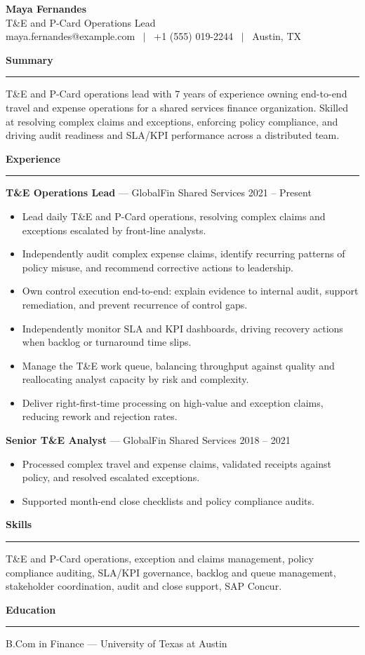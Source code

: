 \documentclass[11pt]{article}
\newcommand{\rsection}[1]{%
  \vspace{10pt}
  {\large\bfseries #1}\\[-4pt]
  \rule{\linewidth}{0.6pt}\vspace{4pt}
}
\begin{document}
\begin{center}
  {\Huge\bfseries Maya Fernandes}\\[4pt]
  T\&E and P-Card Operations Lead \\
  maya.fernandes@example.com \ $\vert$ \ +1 (555) 019-2244 \ $\vert$ \ Austin, TX
\end{center}

\rsection{Summary}
T\&E and P-Card operations lead with 7 years of experience owning end-to-end travel and expense operations for a shared services finance organization. Skilled at resolving complex claims and exceptions, enforcing policy compliance, and driving audit readiness and SLA/KPI performance across a distributed team.

\rsection{Experience}
\textbf{T\&E Operations Lead} --- GlobalFin Shared Services \hfill 2021 -- Present
\begin{itemize}
  \item Lead daily T\&E and P-Card operations, resolving complex claims and exceptions escalated by front-line analysts.
  \item Independently audit complex expense claims, identify recurring patterns of policy misuse, and recommend corrective actions to leadership.
  \item Own control execution end-to-end: explain evidence to internal audit, support remediation, and prevent recurrence of control gaps.
  \item Independently monitor SLA and KPI dashboards, driving recovery actions when backlog or turnaround time slips.
  \item Manage the T\&E work queue, balancing throughput against quality and reallocating analyst capacity by risk and complexity.
  \item Deliver right-first-time processing on high-value and exception claims, reducing rework and rejection rates.
\end{itemize}

\textbf{Senior T\&E Analyst} --- GlobalFin Shared Services \hfill 2018 -- 2021
\begin{itemize}
  \item Processed complex travel and expense claims, validated receipts against policy, and resolved escalated exceptions.
  \item Supported month-end close checklists and policy compliance audits.
\end{itemize}

\rsection{Skills}
T\&E and P-Card operations, exception and claims management, policy compliance auditing, SLA/KPI governance, backlog and queue management, stakeholder coordination, audit and close support, SAP Concur.

\rsection{Education}
B.Com in Finance --- University of Texas at Austin
\end{document}

